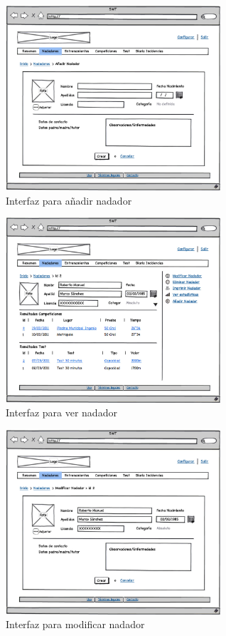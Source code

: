 	\begin{figure}[H]
	  \centering
	    \includegraphics[width=8cm]{./eps/p_interfaz/11_Nadadores_new.eps}
	  \caption{Interfaz para añadir nadador}
	  \label{fig:interfaz_nadadores_new}
	\end{figure}
	
	\begin{figure}[H]
	  \centering
	    \includegraphics[width=8cm]{./eps/p_interfaz/12_Nadadores_show.eps}
	  \caption{Interfaz para ver nadador}
	  \label{fig:interfaz_nadadores_show}
	\end{figure}
	
	\begin{figure}[H]
	  \centering
	    \includegraphics[width=8cm]{./eps/p_interfaz/13_Nadadores_modif.eps}
	  \caption{Interfaz para modificar nadador}
	  \label{fig:interfaz_nadadores_modif}
	\end{figure}
	
